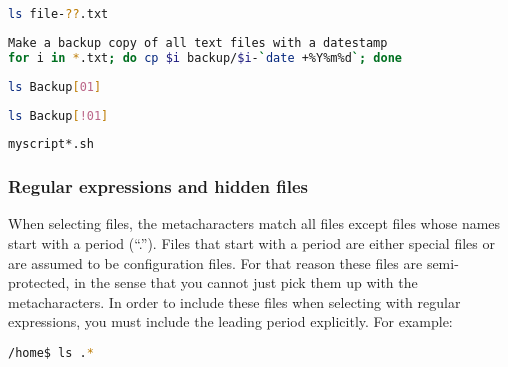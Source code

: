 \lstset{basicstyle=\scriptsize, numbers=left, captionpos=b, tabsize=4}
\begin{lstlisting}[caption=List all files whose names are file- followed by two characters followed by .txt,language={bash},
breaklines=true,xleftmargin=15pt,label=lst:List all files whose names are file- followed by two characters followed by .txt]
ls file-??.txt
\end{lstlisting}

\lstset{basicstyle=\scriptsize, numbers=left, captionpos=b, tabsize=4}
\begin{lstlisting}[caption=Make a backup copy of all text files with a datestamp,language={bash},
breaklines=true,xleftmargin=15pt,label=lst:]Make a backup copy of all text files with a datestamp
for i in *.txt; do cp $i backup/$i-`date +%Y%m%d`; done
\end{lstlisting}

\lstset{basicstyle=\scriptsize, numbers=left, captionpos=b, tabsize=4}
\begin{lstlisting}[caption=List all files in the directories Backup0 and Backup1,language={bash},
breaklines=true,xleftmargin=15pt,label=lst:List all files in the directories Backup0 and Backup1]
ls Backup[01]
\end{lstlisting}

\lstset{basicstyle=\scriptsize, numbers=left, captionpos=b, tabsize=4}
\begin{lstlisting}[caption=List all files in the other backup directories,language={bash},
breaklines=true,xleftmargin=15pt,label=lst:List all files in the other backup directories]
ls Backup[!01]
\end{lstlisting}

\lstset{basicstyle=\scriptsize, numbers=left, captionpos=b, tabsize=4}
\begin{lstlisting}[caption=Execute all shell scripts whose names start with myscript and end in .sh,language={bash},
breaklines=true,xleftmargin=15pt,label=lst:Execute all shell scripts whose names start with myscript and end in .sh]
myscript*.sh
\end{lstlisting}

\subsubsection{Regular expressions and hidden files}
When selecting files, the metacharacters match all files except files whose
names start with a period (``.''). Files that start with a period are either
special files or are assumed to be configuration files. For that reason these
files are semi-protected, in the sense that you cannot just pick them up with
the metacharacters. In order to include these files when selecting with regular
expressions, you must include the leading period explicitly. For example:
\lstset{basicstyle=\scriptsize, numbers=left, captionpos=b, tabsize=4}
\begin{lstlisting}[caption=Lising all files whose names start with a period,language={bash},
breaklines=true,xleftmargin=15pt,label=lst:Lising all files whose names start with a period]
/home$ ls .*
\end{lstlisting}

